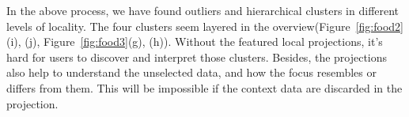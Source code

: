 In the above process, we have found outliers and hierarchical clusters in different levels of locality. The four clusters seem layered in the overview(Figure~\ref{fig:food2}(i), (j), Figure~\ref{fig:food3}(g), (h)). Without the featured local projections, it's hard for users to discover and interpret those clusters. Besides, the projections also help to understand the unselected data, and how the focus resembles or differs from them. This will be impossible if the context data are discarded in the projection.


\label{section:casestudy}